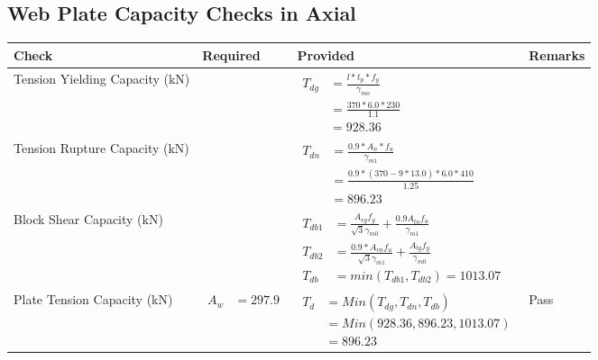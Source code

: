 \documentclass{article}%
\begin{document}
\subsection{Web Plate Capacity Checks in Axial}%
\label{subsec:WebPlateCapacityChecksinAxial}%
\renewcommand{\arraystretch}{1.2}%
\begin{longtable}{|p{4cm}|p{6cm}|p{5.5cm}|p{1.5cm}|}%
\hline%
\rowcolor{OsdagGreen}%
Check&Required&Provided&Remarks\\%
\hline%
\endhead%
\hline%
Tension Yielding Capacity (kN)&&$\begin{aligned} T_{dg} &= \frac{l*t_p*f_y}{\gamma_{mo}}\\ &=\frac{370*6.0*230}{1.1}\\ &=928.36\end{aligned}$&\\%
\hline%
Tension Rupture Capacity (kN)&&$\begin{aligned} T_{dn} &= \frac{0.9*A_{n}*f_u}{\gamma_{m1}}\\ &=\frac{0.9*(370-9*13.0)*6.0*410}{1.25}\\ &=896.23\end{aligned}$&\\%
\hline%
Block Shear Capacity (kN)&&$\begin{aligned}T_{db1} &= \frac{A_{vg} f_{y}}{\sqrt{3} \gamma_{m0}} + \frac{0.9 A_{tn} f_{u}}{\gamma_{m1}}\\ T_{db2} &= \frac{0.9*A_{vn} f_{u}}{\sqrt{3} \gamma_{m1}} + \frac{A_{tg} f_{y}}{\gamma_{m0}}\\ T_{db} &= min(T_{db1}, T_{db2})= 1013.07\end{aligned}$&\\%
\hline%
Plate Tension Capacity (kN)&$\begin{aligned} A_w &=297.9 \end{aligned}$&$\begin{aligned} T_d &= Min(T_{dg},T_{dn},T_{db})\\ &= Min(928.36,896.23,1013.07)\\ &=896.23\end{aligned}$&Pass\\%
\hline%
\end{longtable}

%
\newpage%
\end{document}
